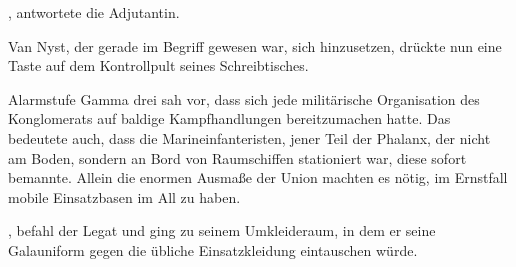 , antwortete die Adjutantin. 

\par

Van Nyst, der gerade im Begriff gewesen war, sich hinzusetzen, drückte nun eine Taste auf dem Kontrollpult seines Schreibtisches. 

\par

Alarmstufe Gamma drei sah vor, dass sich jede militärische Organisation des Konglomerats auf baldige Kampfhandlungen bereitzumachen hatte. Das bedeutete auch, dass die Marineinfanteristen, jener Teil der Phalanx, der nicht am Boden, sondern an Bord von Raumschiffen stationiert war, diese sofort bemannte. Allein die enormen Ausmaße der Union machten es nötig, im Ernstfall mobile Einsatzbasen im All zu haben.

\par

, befahl der Legat und ging zu seinem Umkleideraum, in dem er seine Galauniform gegen die übliche Einsatzkleidung eintauschen würde.